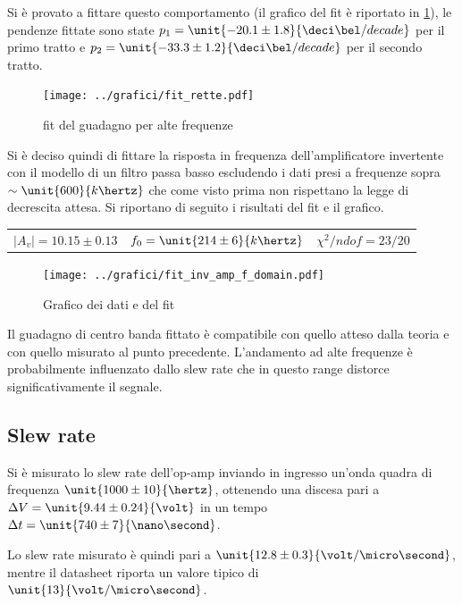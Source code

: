 \documentclass[10pt,a4paper]{article}
\begin{document}
Si è provato a fittare questo comportamento (il grafico del fit è riportato in \figurename{\ref{rette}}), le pendenze fittate sono state $p_1 = \unit{-20.1 \pm 1.8}{\deci\bel/decade}$ per il primo tratto e $p_2 =\unit{-33.3 \pm 1.2}{\deci\bel/decade}$ per il secondo tratto.

\begin{figure}[h!]
	\centering
	\texttt{[image: ../grafici/fit\_rette.pdf]}
	\caption{fit del guadagno per alte frequenze}
	\label{rette}
\end{figure}

Si è deciso quindi di fittare la risposta in frequenza dell'amplificatore invertente con il modello di un filtro passa basso escludendo i dati presi a frequenze sopra $\sim \unit{600}{k\hertz}$ che come visto prima non rispettano la legge di decrescita attesa.  Si riportano di seguito i risultati del fit e il grafico.

\begin{table}[h!]
	\centering
	\begin{tabular}{ccc}
	$|A_v| = 10.15 \pm 0.13$	&	$f_0 = \unit{214 \pm 6}{k\hertz}$	&	$\chi^2/ndof = 23 / 20$\\
	\end{tabular}
\end{table}

\begin{figure}[h!]
	\centering
	\texttt{[image: ../grafici/fit\_inv\_amp\_f\_domain.pdf]}
	\caption{Grafico dei dati e del fit}
	\label{palle}
\end{figure}

Il guadagno di centro banda fittato è compatibile con quello atteso dalla teoria e con quello misurato al punto precedente.
L'andamento ad alte frequenze è probabilmente influenzato dallo slew rate che in questo range distorce significativamente il segnale.
\pagebreak
\subsection{Slew rate}
Si è misurato lo slew rate dell'op-amp inviando in ingresso un'onda quadra di frequenza $\unit{1000 \pm 10}{\hertz}$, ottenendo una discesa pari a  $\Delta V = \unit{9.44 \pm 0.24}{\volt}$ in un tempo $\Delta t = \unit{740 \pm 7}{\nano\second}$.

Lo slew rate misurato è quindi pari a $\unit{12.8 \pm 0.3}{\volt/\micro\second}$, mentre il datasheet riporta un valore tipico di $\unit{13}{\volt/\micro\second}$.

\end{document}
